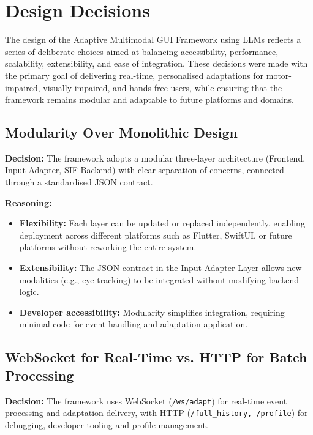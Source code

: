 \documentclass[openany]{book}
\begin{document}

\section{Design Decisions}
The design of the Adaptive Multimodal GUI Framework using LLMs reflects a series of deliberate choices aimed at balancing accessibility, performance, scalability, extensibility, and ease of integration. These decisions were made with the primary goal of delivering real-time, personalised adaptations for motor-impaired, visually impaired, and hands-free users, while ensuring that the framework remains modular and adaptable to future platforms and domains.

\subsection{Modularity Over Monolithic Design}
\textbf{Decision:} The framework adopts a modular three-layer architecture (Frontend, Input Adapter, SIF Backend) with clear separation of concerns, connected through a standardised JSON contract.

\textbf{Reasoning:}
\begin{itemize}
    \item \textbf{Flexibility:} Each layer can be updated or replaced independently, enabling deployment across different platforms such as Flutter, SwiftUI, or future platforms without reworking the entire system.
    \item \textbf{Extensibility:} The JSON contract in the Input Adapter Layer allows new modalities (e.g., eye tracking) to be integrated without modifying backend logic.
    \item \textbf{Developer accessibility:} Modularity simplifies integration, requiring minimal code for event handling and adaptation application.
\end{itemize}

\subsection{WebSocket for Real-Time vs. HTTP for Batch Processing}
\textbf{Decision:} The framework uses WebSocket (\texttt{/ws/adapt}) for real-time event processing and adaptation delivery, with HTTP (\texttt{/full\_history, /profile}) for debugging, developer tooling and profile management.
\end{document}
